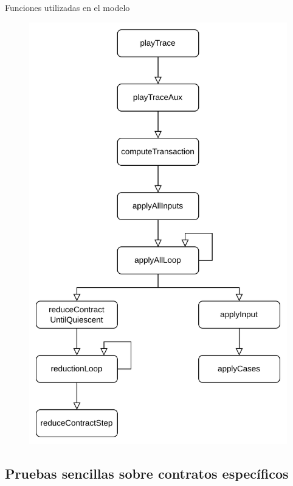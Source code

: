 \documentclass{beamer}
\begin{document}
\begin{frame}{Funciones utilizadas en el modelo}
\begin{figure}[H]
	\centering
	\includegraphics[height=0.8\textheight]{Dependencias_semantica_marlowe.png}
\end{figure}

\end{frame}




\subsection{Pruebas sencillas sobre contratos específicos}
\end{document}
